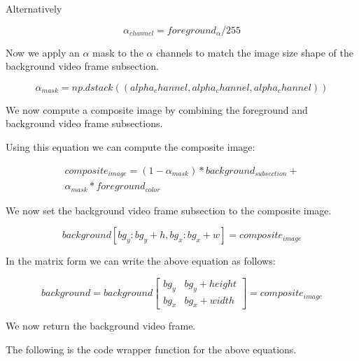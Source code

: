 \documentclass[ebook,12pt,oneside,openany]{memoir}
\begin{document}
Alternatively

\begin{equation}
    \alpha_{channel} = foreground_{\alpha} / 255
\end{equation}

Now we apply an $\alpha$ mask to the $\alpha$ channels to match the image size shape of the background video frame subsection.

\begin{equation}
    \alpha_{mask} = np.dstack((alpha_channel, alpha_channel, alpha_channel))
\end{equation}

We now compute a composite image by combining the foreground and background video frame subsections.

Using this equation we can compute the composite image:

\begin{equation}
\begin{split}
    composite_{image} = (1 - \alpha_{mask}) * background_{subsection} + \\
    \alpha_{mask} * foreground_{color}
\end{split}
\end{equation}

We now set the background video frame subsection to the composite image.

\begin{equation}
    background[bg_y:bg_y + h, bg_x:bg_x + w] = composite_{image}
\end{equation}

In the matrix form we can write the above equation as follows:

\begin{equation}
    background = background \begin{bmatrix} 
        bg_{y} & bg_{y} + height \\
        bg_{x} & bg_{x} + width
    \end{bmatrix} = composite_{image}
\end{equation}

We now return the background video frame.   

The following is the code wrapper function for the above equations.
\end{document}
